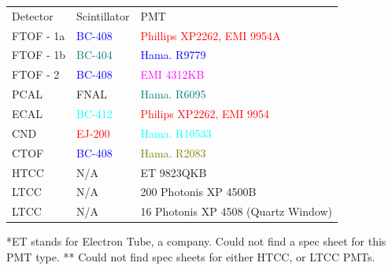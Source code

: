            \begin{table}[H]
                \centering
                    \begin{tabular}{lll}
                        Detector    &   Scintillator                         &   PMT   \\
                        FTOF - 1a   &     \textcolor{blue}{BC-408}           &   \textcolor{red}{Phillips XP2262, EMI 9954A}\\
                        FTOF - 1b   &     \textcolor{teal}{BC-404}           &   \textcolor{blue}{Hama. R9779} \\
                        FTOF - 2    &     \textcolor{blue}{BC-408}           &   \textcolor{magenta}{EMI 4312KB} \\
                        PCAL        &     FNAL                               &   \textcolor{teal}{Hama. R6095}\\
                        ECAL        &     \textcolor{cyan}{BC-412}           &   \textcolor{red}{Philips XP2262, EMI 9954}\\
                        CND         &     \textcolor{red}{EJ-200}            &   \textcolor{cyan}{Hama. R10533} \\
                        CTOF        &     \textcolor{blue}{BC-408}           &   \textcolor{olive}{Hama. R2083} \\
                        HTCC        &         N/A                            &   ET 9823QKB \\
                        LTCC        &           N/A                          &   200 Photonis XP 4500B\\
                        LTCC        &              N/A                       &   16 Photonis XP 4508 (Quartz Window)\\
                    \end{tabular}
            \end{table}
            
            *ET stands for Electron Tube, a company. Could not find a spec sheet for this PMT type. 
            ** Could not find spec sheets for either HTCC, or LTCC PMTs. 
       

